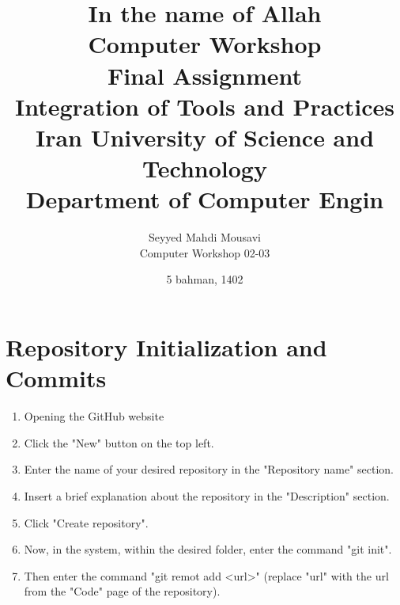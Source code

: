 \documentclass[titlepage]{article}
\title{
    \textbf{\Huge In the name of Allah}\\
    \vspace{2in}
    \textbf{Computer Workshop}\\
    Final Assignment\\
    Integration of Tools and Practices\\
    \vspace{0.1in}
    \large Iran University of Science and Technology\\
    \large Department of Computer Engin
    \vspace{0.5in}
}
\author{
    \vspace{0.1in}
    Seyyed Mahdi Mousavi\\
    Computer Workshop 02-03\\
    \vspace{0.2in}
}
\date{5 bahman, 1402}
\begin{document}
\pagestyle{fancy}

\maketitle
\tableofcontents
\newpage

\maketitle

\section{Repository Initialization and Commits}
\begin{enumerate}
    \item Opening the GitHub website
    \item Click the "New" button on the top left.
    \item Enter the name of your desired repository in the "Repository name" section.
    \item Insert a brief explanation about the repository in the "Description" section.
    \item Click "Create repository".
    \item Now, in the system, within the desired folder, enter the command "git init".
    \item Then enter the command "git remot add <url>" (replace "url" with the url from the "Code" page of the repository).
\end{enumerate}
\end{document}
